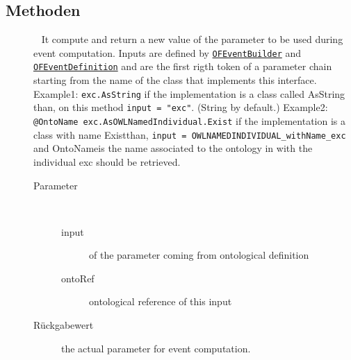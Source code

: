 \subsection{Methoden}
\begin{description}
\item[{\label{ontologyFramework.OFEventManagement.OFEventParameterInterface.getParameter(java.lang.Object,ontologyFramework.OFContextManagement.OWLReferences)}}]
~ It compute and return a new value of the parameter to be used during
 event computation. Inputs are defined by \texttt{\hyperlink{ontologyFramework.OFEventManagement.OFLogicalEventManagement.OFEventBuilder-class}{OFEventBuilder}} and
 \texttt{\hyperlink{ontologyFramework.OFEventManagement.OFLogicalEventManagement.OFEventDefinition-class}{OFEventDefinition}} and are the first rigth token of a parameter chain
 starting from the name of the class that implements this interface.
 Example1: \verb!exc.AsString! if the implementation is a class called \textquotedbl AsString\textquotedbl 
 than, on this method \verb!input = "exc"!. (String by default.)
 Example2: \verb!@OntoName exc.AsOWLNamedIndividual.Exist! if the implementation is a class
 with name \textquotedbl Exist\textquotedbl  than, \verb!input = OWLNAMEDINDIVIDUAL_withName_exc!
 and \textquotedbl OntoName\textquotedbl  is the name associated to the ontology in with the individual \textquotedbl exc\textquotedbl 
 should be retrieved.
\begin{description}
\item[Parameter] ~
\begin{description}
\item[input]
of the parameter coming from ontological definition
\item[ontoRef]
ontological reference of this input
\end{description}
\item[Rückgabewert] 
the actual parameter for event computation.
\end{description}
\end{description}
